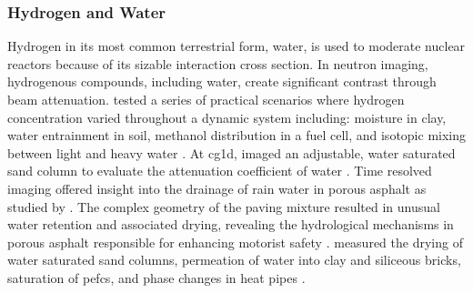 \documentclass[../../../main.tex]{subfiles}%
\begin{document}
%
    \subsubsection{Hydrogen and Water}%
    \label{sec:chapter-1:motivation:hydrogen-and-water}%
    Hydrogen in its most common terrestrial form, water, is used to moderate nuclear reactors because of its sizable interaction cross section.
    In neutron imaging, hydrogenous compounds, including water, create significant contrast through beam attenuation.
    \citeauthor*{Lehmann_2004} tested a series of practical scenarios where hydrogen concentration varied throughout a dynamic system including: moisture in clay, water entrainment in soil, methanol distribution in a fuel cell, and isotopic mixing between light and heavy water \cite{Lehmann_2004}.
    At \gls{cg1d}, \citeauthor*{Kang_2013} imaged an adjustable, water saturated sand column to evaluate the attenuation coefficient of water \cite{Kang_2013}.
    Time resolved imaging offered insight into the drainage of rain water in porous asphalt as studied by \citeauthor*{Poulikakos_2013}.
    The complex geometry of the paving mixture resulted in unusual water retention and associated drying, revealing the hydrological mechanisms in porous asphalt responsible for enhancing motorist safety \cite{Poulikakos_2013}.
    \citeauthor*{Perfect_2014} measured the drying of water saturated sand columns, permeation of water into clay and siliceous bricks, saturation of \glspl{pefc}, and phase changes in heat pipes \cite{Perfect_2014}.
\end{document}
